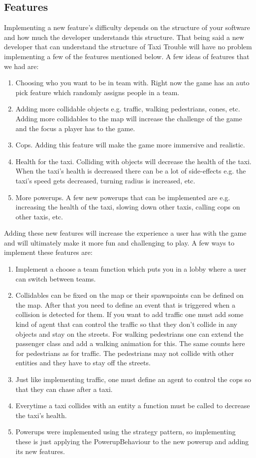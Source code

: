 \subsection*{Features}
Implementing a new feature's difficulty depends on the structure of your software and how much the developer understands this structure. That being said a new developer that can understand the structure of Taxi Trouble will have no problem implementing a few of the features mentioned below. A few ideas of features that we had are:
\begin{enumerate}
\item Choosing who you want to be in team with. Right now the game has an auto pick feature which randomly assigns people in a team.
\item Adding more collidable objects e.g. traffic, walking pedestrians, cones, etc. Adding more collidables to the map will increase the challenge of the game and the focus a player has to the game.
\item Cops. Adding this feature will make the game more immersive and realistic.
\item Health for the taxi. Colliding with objects will decrease the health of the taxi. When the taxi's health is decreased there can be a lot of side-effects e.g. the taxi's speed gets decreased, turning radius is increased, etc.
\item More powerups. A few new powerups that can be implemented are e.g. increasing the health of the taxi, slowing down other taxis, calling cops on other taxis, etc.
\end{enumerate}
Adding these new features will increase the experience a user has with the game and will ultimately make it more fun and challenging to play. A few ways to implement these features are:
\begin{enumerate}	
\item Implement a choose a team function which puts you in a lobby where a user can switch between teams.
\item Collidables can be fixed on the map or their spawnpoints can be defined on the map. After that you need to define an event that is triggered when a collision is detected for them. If you want to add traffic one must add some kind of agent that can control the traffic so that they don't collide in any objects and stay on the streets. For walking pedestrians one can extend the passenger class and add a walking animation for this. The same counts here for pedestrians as for traffic. The pedestrians may not collide with other entities and they have to stay off the streets.
\item Just like implementing traffic, one must define an agent to control the cops so that they can chase after a taxi.
\item Everytime a taxi collides with an entity a function must be called to decrease the taxi's health.
\item Powerups were implemented using the strategy pattern, so implementing these is just applying the PowerupBehaviour to the new powerup and adding its new features.
\end{enumerate}
